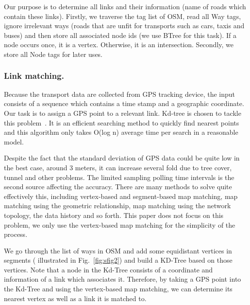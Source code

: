 \documentclass{acm_proc_article-sp}
\begin{document}
		\setlength{\parindent}{0.7cm} Our purpose is to determine all links and their information (name of roads which contain these links). Firstly, we traverse the tag list of OSM, read all Way tags, ignore irrelevant ways (roads that are unfit for transports such as cars, taxis and buses) and then store all associated node ids (we use BTree for this task). If a node occurs once, it is a vertex. Otherwise, it is an intersection. Secondly, we store all Node tags for later uses.
	
\subsubsection{Link matching.}
	
	Because the transport data are collected from GPS tracking device, the input consists of a sequence which contains a time stamp and a geographic coordinate. Our task is to assign a GPS point to a relevant link. Kd-tree is chosen to tackle this problem~\cite{moh2013approximate}. It is an efficient searching method to quickly find nearest points and this algorithm only takes O(log n) average time per search in a reasonable model.
	
	\setlength{\parindent}{0.7cm} Despite the fact that the standard deviation of GPS data could be quite low in the best case, around 3 meters, it can increase several fold due to tree cover, tunnel and other problems. The limited sampling polling time intervals is the second source affecting the accuracy. There are many methods to solve quite effectively this, including vertex-based and segment-based map matching, map matching using the geometric relationship, map matching using the network topology, the data history and so forth. This paper does not focus on this problem, we only use the vertex-based map matching for the simplicity of the process.  
	
	
	\setlength{\parindent}{0.7cm} We go through the list of ways in OSM and add some equidistant vertices in segments ( illustrated in Fig.~\ref{fig:sfig2}) and build a KD-Tree based on those vertices. Note that a node in the Kd-Tree consists of a coordinate and information of a link which associates it. Therefore, by taking a GPS point into the Kd-Tree and using the vertex-based map matching, we can determine its nearest vertex as well as a link it is matched to.
	
\end{document}
